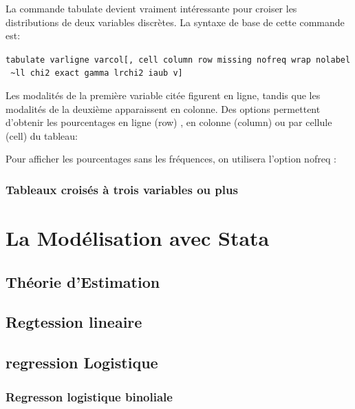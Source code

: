 \documentclass[
]{book}
\begin{document}
La commande tabulate devient vraiment intéressante pour croiser les distributions de deux variables discrètes. La syntaxe de base de cette commande est:

\texttt{tabulate\ varligne\ varcol{[},\ cell\ column\ row\ missing\ nofreq\ wrap\ nolabel\ \textasciitilde{}ll\ chi2\ exact\ gamma\ lrchi2\ iaub\ v{]}}

Les modalités de la première variable citée figurent en ligne, tandis que les modalités de la deuxième apparaissent en colonne. Des options permettent d'obtenir les pourcentages en ligne (row) , en colonne (column) ou par cellule (cell) du tableau:

Pour afficher les pourcentages sans les fréquences, on utilisera l'option nofreq :

\hypertarget{tableaux-croisuxe9s-uxe0-trois-variables-ou-plus}{%
\subsection{Tableaux croisés à trois variables ou plus}\label{tableaux-croisuxe9s-uxe0-trois-variables-ou-plus}}

\hypertarget{la-moduxe9lisation-avec-stata}{%
\chapter{La Modélisation avec Stata}\label{la-moduxe9lisation-avec-stata}}

\hypertarget{thuxe9orie-destimation}{%
\section{Théorie d'Estimation}\label{thuxe9orie-destimation}}

\hypertarget{regtession-lineaire}{%
\section{Regtession lineaire}\label{regtession-lineaire}}

\hypertarget{regression-logistique}{%
\section{regression Logistique}\label{regression-logistique}}

\hypertarget{regresson-logistique-binoliale}{%
\subsection{Regresson logistique binoliale}\label{regresson-logistique-binoliale}}
\end{document}

